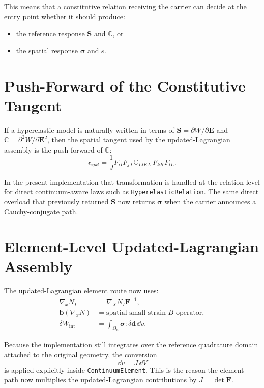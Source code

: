 This means that a constitutive relation receiving the carrier can decide at the
entry point whether it should produce:
\begin{itemize}
  \item the reference response $\mathbf{S}$ and $\mathbb{C}$, or
  \item the spatial response $\boldsymbol{\sigma}$ and $\mathcal{c}$.
\end{itemize}

\section{Push-Forward of the Constitutive Tangent}

If a hyperelastic model is naturally written in terms of
$\mathbf{S} = \partial W / \partial \mathbf{E}$ and
$\mathbb{C} = \partial^2 W / \partial \mathbf{E}^2$, then the spatial tangent
used by the updated-Lagrangian assembly is the push-forward of
$\mathbb{C}$:
\[
  \mathcal{c}_{ijkl}
  = \frac{1}{J}
    F_{iI}F_{jJ}\,\mathbb{C}_{IJKL}\,F_{kK}F_{lL}.
\]

In the present implementation that transformation is handled at the relation
level for direct continuum-aware laws such as \texttt{HyperelasticRelation}.
The same direct overload that previously returned $\mathbf{S}$ now returns
$\boldsymbol{\sigma}$ when the carrier announces a Cauchy-conjugate path.

\section{Element-Level Updated-Lagrangian Assembly}

The updated-Lagrangian element route now uses:
\begin{align}
  \nabla_x N_I &= \nabla_X N_I \mathbf{F}^{-1}, \\
  \mathbf{b}(\nabla_x N) &= \text{spatial small-strain } B\text{-operator}, \\
  \delta W_{\text{int}}
    &= \int_{\Omega_n} \boldsymbol{\sigma} : \delta\mathbf{d}\, \dd v.
\end{align}

Because the implementation still integrates over the reference quadrature
domain attached to the original geometry, the conversion
\[
  \dd v = J \, \dd V
\]
is applied explicitly inside \texttt{ContinuumElement}. This is the reason the
element path now multiplies the updated-Lagrangian contributions by
$J = \det\mathbf{F}$.

